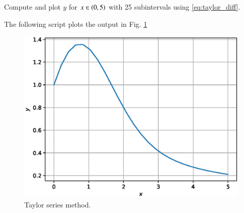 \documentclass[journal,12pt,twocolumn]{IEEEtran}
\begin{document}
\begin{problem}
Compute and plot $y$ for $x \in \left(0,5\right)$ with 25 subintervals using \eqref{eq:taylor_diff}.
\end{problem}
\solution The following script plots the output in Fig. \ref{fig:taylor}

\begin{figure}[!h]
\centering
\includegraphics[width=\columnwidth]{./figs/taylor.eps}
\caption{Taylor series method.}
\label{fig:taylor}
\end{figure}
%
\end{document}
